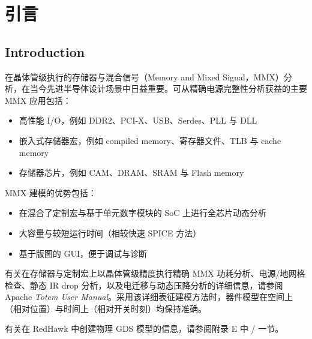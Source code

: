 ﻿%
\label{chap:mms}

\section{引言}
\subsection*{Introduction}

在晶体管级执行的存储器与混合信号（Memory and Mixed Signal，MMX）分析，在当今先进半导体设计场景中日益重要。可从精确电源完整性分析获益的主要 MMX 应用包括：
\begin{itemize}
  \item 高性能 I/O，例如 DDR2、PCI-X、USB、Serdes、PLL 与 DLL
  \item 嵌入式存储器宏，例如 compiled memory、寄存器文件、TLB 与 cache memory
  \item 存储器芯片，例如 CAM、DRAM、SRAM 与 Flash memory
\end{itemize}

MMX 建模的优势包括：
\begin{itemize}
  \item 在混合了定制宏与基于单元数字模块的 SoC 上进行全芯片动态分析
  \item 大容量与较短运行时间（相较快速 SPICE 方法）
  \item 基于版图的 GUI，便于调试与诊断
\end{itemize}

有关在存储器与定制宏上以晶体管级精度执行精确 MMX 功耗分析、电源/地网格检查、静态 IR drop 分析，以及电迁移与动态压降分析的详细信息，请参阅 Apache \textit{Totem User Manual}。采用该详细表征建模方法时，器件模型在空间上（相对位置）与时间上（相对开关时刻）均保持准确。

有关在 RedHawk 中创建物理 GDS 模型的信息，请参阅附录 E 中 / 一节。
